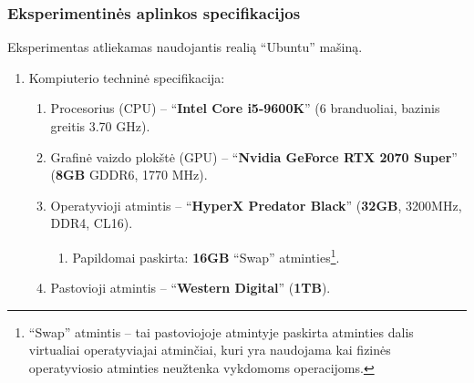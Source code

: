 \documentclass{VUMIFPSbakalaurinis}
\begin{document}
\subsubsection{Eksperimentinės aplinkos specifikacijos}
{
Eksperimentas atliekamas naudojantis realią \enquote{Ubuntu} mašiną.

\begin{enumerate}
	\item Kompiuterio techninė specifikacija:
	\begin{enumerate}
		\item Procesorius (CPU) -- \enquote{\textbf{Intel Core i5-9600K}} (6 branduoliai, bazinis greitis 3.70 GHz).
		\item Grafinė vaizdo plokštė (GPU) -- \enquote{\textbf{Nvidia GeForce RTX 2070 Super}} (\textbf{8GB} GDDR6, 1770 MHz).
		\item Operatyvioji atmintis -- \enquote{\textbf{HyperX Predator Black}} (\textbf{32GB}, 3200MHz, DDR4, CL16).
		\begin{enumerate}
			\item Papildomai paskirta: \textbf{16GB} \enquote{Swap} atminties\footnote{\enquote{Swap} atmintis -- tai pastoviojoje atmintyje paskirta atminties dalis virtualiai operatyviajai atminčiai, kuri yra naudojama kai fizinės operatyviosio atminties neužtenka vykdomoms operacijoms.}.
		\end{enumerate}
		\item Pastovioji atmintis -- \enquote{\textbf{Western Digital}} (\textbf{1TB}).
	\end{enumerate}


\end{enumerate}}
\end{document}
